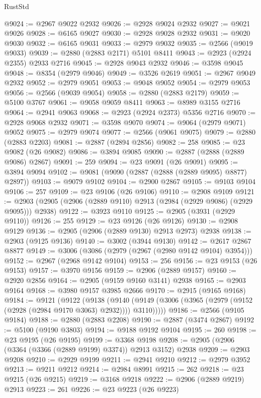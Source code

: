 \begin{lexlean}{RustStd}
\begin{coremodule}
@9024 := @2967 @9022 @2932
@9026 := @2928 @9024 @2932
@9027 := @9021 @9026
@9028 := @6165 @9027
@9030 := @2928 @9028 @2932
@9031 := @9020 @9030
@9032 := @6165 @9031
@9033 := @2979 @9032
@9035 := @2566 (@9019 @9033)
@9039 := @2880 (@2883 @2171) @5101 @8411
@9043 := @2923 (@2924 @2355) @2933 @2716
@9045 := @2928 @9043 @2932
@9046 := @3598 @9045
@9048 := @8354 (@2979 @9046)
@9049 := @3526 @2619
@9051 := @2967 @9049 @2932
@9052 := @2979 @9051
@9053 := @9048 @9052
@9054 := @2979 @9053
@9056 := @2566 (@9039 @9054)
@9058 := @2880 (@2883 @2179)
@9059 := @5100 @3767
@9061 := @9058 @9059 @8411
@9063 := @8989 @3155 @2716
@9064 := @2941 @9063
@9068 := @2923 (@2924 @2373) @5356 @2716
@9070 := @2928 @9068 @2932
@9071 := @3598 @9070
@9074 := @9064 (@2979 @9071) @9052
@9075 := @2979 @9074
@9077 := @2566 (@9061 @9075)
@9079 := @2880 (@2883 @2203)
@9081 := @2887 (@2894 @2856)
@9082 := 258
@9085 := @23 @9082 (@26 @9082)
@9086 := @3894 @9085
@9090 := @2887 (@2888 (@2889 @9086) @2867)
@9091 := 259
@9094 := @23 @9091 (@26 @9091)
@9095 := @3894 @9094
@9102 := @9081 (@9090 (@2887 (@2888 (@2889 @9095) @8877) @2897))
@9103 := @9079 @9102
@9104 := @2900 @2867
@9105 := @9103 @9104
@9106 := 257
@9109 := @23 @9106 (@26 @9106)
@9110 := @2908 @9109
@9121 := @2903 (@2905 (@2906 (@2889 @9110) @2913 (@2984 (@2929 @9086) (@2929 @9095))) @2938)
@9122 := @3923 @9110
@9125 := @2905 (@3931 (@2929 @9110))
@9126 := 255
@9129 := @23 @9126 (@26 @9126)
@9130 := @2908 @9129
@9136 := @2905 (@2906 (@2889 @9130) @2913 @2973) @2938
@9138 := @2903 (@9125 @9136)
@9140 := @3002 (@3944 @9130)
@9142 := @2617 @2867 @8877
@9149 := @3006 (@3086 (@2979 (@2967 (@2980 @9142 @9104) @3954)))
@9152 := @2967 (@2968 @9142 @9104)
@9153 := 256
@9156 := @23 @9153 (@26 @9153)
@9157 := @3970 @9156
@9159 := @2906 (@2889 @9157)
@9160 := @2920 @2856
@9164 := @2905 (@9159 @9160 @3141) @2938
@9165 := @2903 @9164
@9168 := @3980 @9157 @3985 @2666
@9170 := @2915 (@9165 @9168)
@9184 := @9121
    (@9122
      (@9138
        (@9140 (@9149 (@3006 (@3965 (@2979 (@9152 (@2928 (@2984 @9170 @3063) @2932)))) @3110)))))
@9186 := @2566 (@9105 @9184)
@9188 := @2880 (@2883 @2208)
@9190 := @2887 (@3474 @2867)
@9192 := @5100 (@9190 @3803)
@9194 := @9188 @9192 @9104
@9195 := 260
@9198 := @23 @9195 (@26 @9195)
@9199 := @3368 @9198
@9208 := @2905 (@2906 (@3364 (@3366 (@2889 @9199) @3374)) @2913 @3152) @2938
@9209 := @2903 @9208
@9210 := @2929 @9199
@9211 := @2941 @9210
@9212 := @2979 @3952
@9213 := @9211 @9212
@9214 := @2984 @8991
@9215 := 262
@9218 := @23 @9215 (@26 @9215)
@9219 := @3168 @9218
@9222 := @2906 (@2889 @9219) @2913
@9223 := 261
@9226 := @23 @9223 (@26 @9223)

\end{coremodule}
\end{lexlean}
